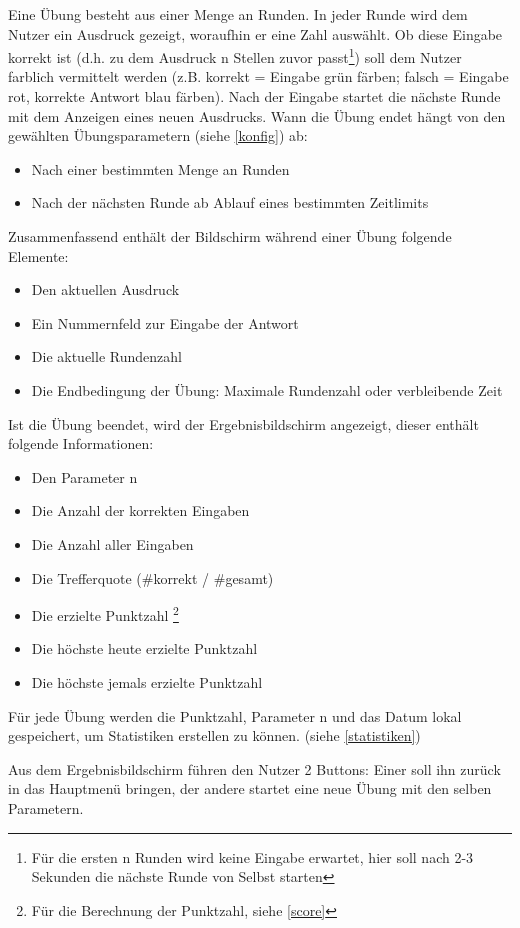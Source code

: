 Eine Übung besteht aus einer Menge an Runden.
In jeder Runde wird dem Nutzer ein Ausdruck gezeigt, woraufhin er
eine Zahl auswählt. Ob diese Eingabe korrekt ist (d.h. zu dem Ausdruck n Stellen zuvor passt\footnote{Für die ersten n Runden wird keine Eingabe erwartet, hier soll nach 2-3 Sekunden die nächste Runde von Selbst starten})
soll dem Nutzer farblich vermittelt werden (z.B. korrekt = Eingabe grün färben; falsch = Eingabe rot, korrekte Antwort blau färben).
Nach der Eingabe startet die nächste Runde mit dem Anzeigen eines neuen Ausdrucks.
Wann die Übung endet hängt von den gewählten Übungsparametern (siehe \ref{konfig}) ab:
\begin{itemize}[itemsep=0pt]
  \item Nach einer bestimmten Menge an Runden
  \item Nach der nächsten Runde ab Ablauf eines bestimmten Zeitlimits
\end{itemize}
Zusammenfassend enthält der Bildschirm während einer Übung folgende Elemente:
\begin{itemize}[itemsep=0pt]
  \item Den aktuellen Ausdruck
  \item Ein Nummernfeld zur Eingabe der Antwort
  \item Die aktuelle Rundenzahl
  \item Die Endbedingung der Übung: Maximale Rundenzahl oder verbleibende Zeit
\end{itemize}
Ist die Übung beendet, wird der Ergebnisbildschirm angezeigt, dieser enthält
folgende Informationen:
\begin{itemize}[itemsep=0pt]
  \item Den Parameter n
  \item Die Anzahl der korrekten Eingaben
  \item Die Anzahl aller Eingaben
  \item Die Trefferquote (\#korrekt / \#gesamt)
  \item Die erzielte Punktzahl \footnote{Für die Berechnung der Punktzahl, siehe \ref{score}}
  \item Die höchste heute erzielte Punktzahl
  \item Die höchste jemals erzielte Punktzahl
\end{itemize}
Für jede Übung werden die Punktzahl, Parameter n und das Datum lokal gespeichert,
um Statistiken erstellen zu können. (siehe \ref{statistiken})

Aus dem Ergebnisbildschirm führen den Nutzer 2 Buttons: Einer soll ihn zurück in das Hauptmenü bringen,
der andere startet eine neue Übung mit den selben Parametern.

